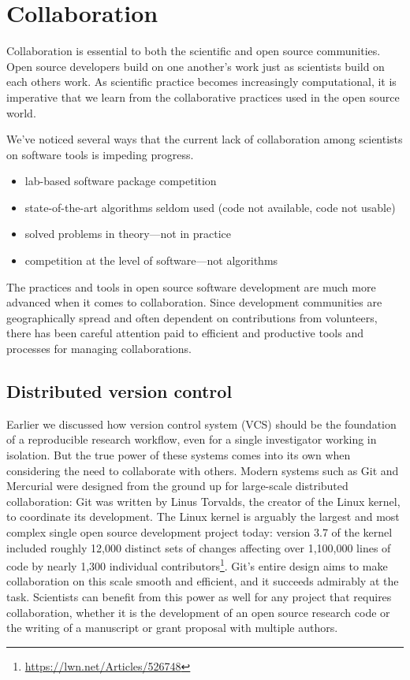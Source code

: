 \documentclass[ChapterTOCs,krantz2]{krantz} %
\theoremstyle{definition}
\begin{document}
\section{\label{sec:collaboration}Collaboration}

Collaboration is essential to both the scientific and open source
communities. Open source developers build on one another's work just
as scientists build on each others work. As scientific practice
becomes increasingly computational, it is imperative that we
learn from the collaborative practices used in the open
source world.

We've noticed several ways that the current lack of collaboration
among scientists on software tools is impeding progress.

\begin{itemize}
\item lab-based software package competition
\item state-of-the-art algorithms seldom used (code not available, code not usable)
\item solved problems in theory---not in practice
\item competition at the level of software---not algorithms
\end{itemize}


The practices and tools in open source software development are much more
advanced when it comes to collaboration. Since development communities are
geographically spread and often dependent on contributions from volunteers,
there has been careful attention paid to efficient and productive tools and
processes for managing collaborations.


\subsection{Distributed version control}

Earlier we discussed how version control system (VCS) should be the foundation of a
reproducible research workflow, even for a single investigator working in
isolation.  But the true power of these systems comes into its own when
considering the need to collaborate with others.  Modern systems such as Git
and Mercurial were designed from the ground up for large-scale distributed
collaboration: Git was written by Linus Torvalds, the creator of the Linux
kernel, to coordinate its development.  The Linux kernel is arguably the
largest and most complex single open source development project today: version
3.7 of the kernel included roughly 12,000 distinct sets of changes affecting
over 1,100,000 lines of code by nearly 1,300 individual
contributors\footnote{\url{https://lwn.net/Articles/526748}}.  Git's entire
design aims to make collaboration on this scale smooth and efficient, and it
succeeds admirably at the task.  Scientists can benefit from this power as well
for any project that requires collaboration, whether it is the development of
an open source research code or the writing of a manuscript or grant proposal
with multiple authors.
\end{document}
